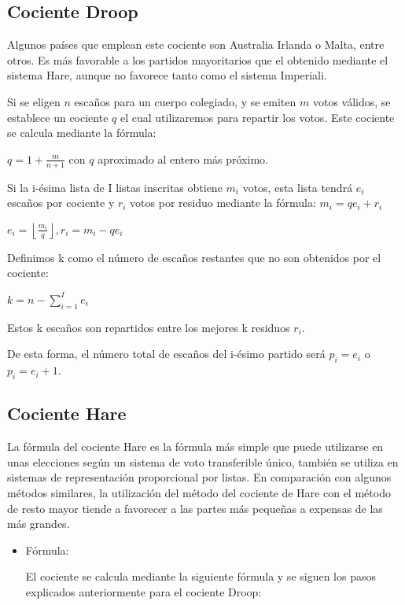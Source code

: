 \documentclass[12pt,a4paper,]{book}
\numberwithin{dummy}{section}
\theoremstyle{ocrenumbox}
\theoremstyle{blacknumex}
\theoremstyle{blacknumbox}
\theoremstyle{ocrenum}
\theoremstyle{ocrenum}
\begin{document}
\hypertarget{cociente-droop}{%
\subsection{Cociente Droop}\label{cociente-droop}}

Algunos países que emplean este cociente son Australia Irlanda o Malta,
entre otros. Es más favorable a los partidos mayoritarios que el
obtenido mediante el sistema Hare, aunque no favorece tanto como el
sistema Imperiali.

Si se eligen \({n}\) escaños para un cuerpo colegiado, y se emiten
\({m}\) votos válidos, se establece un cociente \({q}\) el cual
utilizaremos para repartir los votos. Este cociente se calcula mediante
la fórmula:

\({q=1+{\frac {m}{n+1}}}\) con \(q\) aproximado al entero más próximo.

Si la i-ésima lista de I listas inscritas obtiene \({m_{i}}\) votos,
esta lista tendrá \({e_{i}}\) escaños por cociente y \({r_{i}}\) votos
por residuo mediante la fórmula: \({m_{i}=qe_{i}+r_{i}}\)

\({e_{i}=\left\lfloor {\frac {m_{i}}{q}}\right\rfloor ,r_{i}=m_{i}-qe_{i}}\)

Definimos k como el número de escaños restantes que no son obtenidos por
el cociente:

\({k=n-\sum _{i=1}^{I}e_{i}}\)

Estos k escaños son repartidos entre los mejores k residuos \({r_{i}}\).

De esta forma, el número total de escaños del i-ésimo partido será
\({p_{i}=e_{i}}\) o \({p_{i}=e_{i}+1}\).

\hypertarget{cociente-hare}{%
\subsection{Cociente Hare}\label{cociente-hare}}

La fórmula del cociente Hare es la fórmula más simple que puede
utilizarse en unas elecciones según un sistema de voto transferible
único, también se utiliza en sistemas de representación proporcional por
listas. En comparación con algunos métodos similares, la utilización del
método del cociente de Hare con el método de resto mayor tiende a
favorecer a las partes más pequeñas a expensas de las más grandes.

\begin{itemize}
\item
  Fórmula:

  El cociente se calcula mediante la siguiente fórmula y se siguen los
  pasos explicados anteriormente para el cociente Droop:
\end{itemize}
\end{document}
